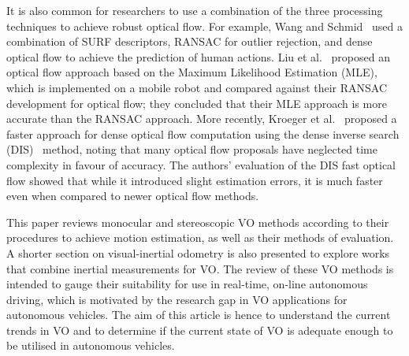 
It is also common for researchers to use a combination of the three processing techniques to achieve robust optical flow. For example, Wang and Schmid~\cite{wang_action_2013} used a combination of SURF descriptors, RANSAC for outlier rejection, and dense optical flow to achieve the prediction of human actions. Liu et al.~\cite{liu_maximum_2016} proposed an optical flow approach based on the Maximum Likelihood Estimation (MLE), which is implemented on a mobile robot and compared against their RANSAC development for optical flow; they concluded that their MLE approach is more accurate than the RANSAC approach. More recently, Kroeger et al.~\cite{kroeger_fast_2016} proposed a faster approach for dense optical flow computation using the dense inverse search (DIS)~\cite {s._baker_equivalence_2001} method, noting that many optical flow proposals have neglected time complexity in favour of accuracy. The authors' evaluation of the DIS fast optical flow showed that while it introduced slight estimation errors, it is much faster even when compared to newer optical flow methods. 


This paper reviews monocular and stereoscopic VO methods according to their procedures to achieve motion estimation, as well as their methods of evaluation. A shorter section on visual-inertial odometry is also presented to explore works that combine inertial measurements for VO. The review of these VO methods is intended to gauge their suitability for use in real-time, on-line autonomous driving, which is motivated by the research gap in VO applications for autonomous vehicles. The aim of this article is hence to understand the current trends in VO and to determine if the current state of VO is adequate enough to be utilised in autonomous vehicles. 

